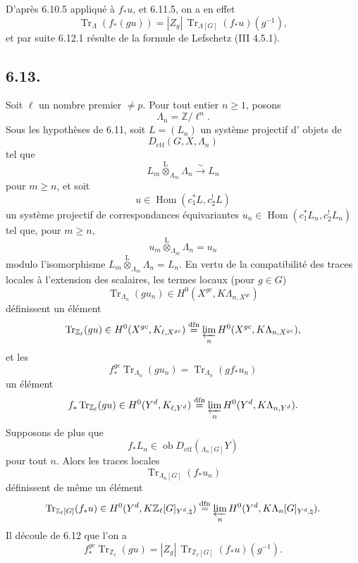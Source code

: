 \documentclass[11pt]{article}
\DeclareMathOperator{\Hom}{Hom}
\providecommand{\Tr}{\operatorname{Tr}}
\providecommand{\Tr}{\operatorname{Tr}}
\providecommand{\lten}{\overset{\mathrm L}{\otimes}}
\providecommand{\Ob}{\operatorname{ob}}
\providecommand{\Tr}{\operatorname{Tr}}
\providecommand{\Hom}{\operatorname{Hom}}
\providecommand{\lten}{\overset{\mathrm L}{\otimes}}
\providecommand{\lten}{\overset{\mathrm L}{\otimes}}
\providecommand{\Ob}{\operatorname{ob}}
\providecommand{\Tr}{\operatorname{Tr}}
\providecommand{\lten}{\overset{\mathrm L}{\otimes}}
\providecommand{\lten}{\overset{\mathrm L}{\otimes}}
\providecommand{\Ob}{\operatorname{Ob}}
\providecommand{\lten}{\overset{\mathrm L}{\otimes}}
\providecommand{\Hom}{\operatorname{Hom}}
\providecommand{\Tr}{\operatorname{Tr}}
\providecommand{\Ob}{\operatorname{ob}}
\providecommand{\Ob}{\operatorname{Ob}}
\providecommand{\lten}{\overset{\mathrm L}{\otimes}}
\begin{document}
D'après 6.10.5 appliqué à $f_*u$, et 6.11.5, on a en effet
\[
\Tr_{\Lambda}(f_*(gu))=|Z_g|\,\Tr_{\Lambda[G]}(f_*u)(g^{-1}),
\]
et par suite 6.12.1 résulte de la formule de Lefschetz (III 4.5.1).

\subsection*{6.13.}
Soit $\ell$ un nombre premier $\ne p$. Pour tout entier $n\ge1$, posons
\[
\Lambda_n=\mathbb Z/\ell^n.
\]
Sous les hypothèses de 6.11, soit $L=(L_n)$ un système projectif 
d'%
objets de
\[
D_{\mathrm{ctf}}(G,X,\Lambda_n)
\]
tel que
\[
L_m\lten_{\Lambda_m}\Lambda_n\xrightarrow{\sim}L_n
\]
pour $m\ge n$, et soit
\[
u\in\Hom(c_1^*L,c_2^!L)
\]
un système projectif de correspondances équivariantes $u_n\in\Hom(c_1^*L_n,c_2^!L_n)$ tel que, pour $m\ge n$,
\[
u_m\lten_{\Lambda_m}\Lambda_n=u_n
\]
modulo l'isomorphisme $L_m\lten_{\Lambda_m}\Lambda_n=L_n$. En vertu de la compatibilité des traces locales à l'extension des scalaires, les termes locaux (pour $g\in G$)
\[
\Tr_{\Lambda_n}(gu_n)\in H^0(X^{gc},K\Lambda_{n,X^{gc}})
\]
définissent un élément
\[
\Tr_{\mathbb Z_{\ell}}(gu)\in
H^0(X^{gc},K_{\ell,X^{gc}})
\stackrel{\mathrm{dfn}}{=}
\varprojlim_n H^0(X^{gc},K\Lambda_{n,X^{gc}}),
\]
et les
\[
f_*^{gc}\Tr_{\Lambda_n}(gu_n)=\Tr_{\Lambda_n}(gf_*u_n)
\]
un élément
\[
f_*\Tr_{\mathbb Z_{\ell}}(gu)\in
H^0(Y^d,K_{\ell,Y^d})
\stackrel{\mathrm{dfn}}{=}
\varprojlim_n H^0(Y^d,K\Lambda_{n,Y^d}).
\]
Supposons de plus que
\[
f_*L_n\in\Ob D_{\mathrm{ctf}}({}_{\Lambda_n[G]}Y)
\]
pour tout $n$. Alors les traces locales
\[
\Tr_{\Lambda_n[G]}(f_*u_n)
\]
définissent de même un élément
\[
\Tr_{\mathbb Z_{\ell}[G]}(f_*u)\in
H^0(Y^d,K\mathbb Z_{\ell}[G]_{Y^d,\natural})
\stackrel{\mathrm{dfn}}{=}
\varprojlim_n H^0(Y^d,K\Lambda_n[G]_{Y^d,\natural}).
\]
Il découle de 6.12 que l'on a
\begin{equation}
f_*^{gc}\Tr_{\mathbb Z_{\ell}}(gu)
=
|Z_g|\,\Tr_{\mathbb Z_{\ell}[G]}(f_*u)(g^{-1}).
\tag{6.13.1}
\end{equation}
\end{document}

